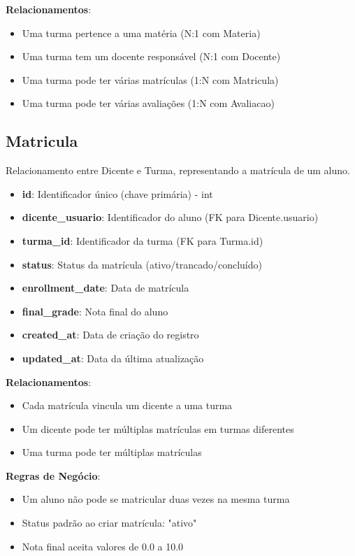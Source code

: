 \documentclass[a4paper,12pt]{article}
\begin{document}
\textbf{Relacionamentos}:
\begin{itemize}
    \item Uma turma pertence a uma matéria (N:1 com Materia)
    \item Uma turma tem um docente responsável (N:1 com Docente)
    \item Uma turma pode ter várias matrículas (1:N com Matricula)
    \item Uma turma pode ter várias avaliações (1:N com Avaliacao)
\end{itemize}

\subsection{Matricula}

Relacionamento entre Dicente e Turma, representando a matrícula de um aluno.

\begin{itemize}
    \item \textbf{id}: Identificador único (chave primária) - int
    \item \textbf{dicente\_usuario}: Identificador do aluno (FK para Dicente.usuario)
    \item \textbf{turma\_id}: Identificador da turma (FK para Turma.id)
    \item \textbf{status}: Status da matrícula (ativo/trancado/concluído)
    \item \textbf{enrollment\_date}: Data de matrícula
    \item \textbf{final\_grade}: Nota final do aluno
    \item \textbf{created\_at}: Data de criação do registro
    \item \textbf{updated\_at}: Data da última atualização
\end{itemize}

\textbf{Relacionamentos}:
\begin{itemize}
    \item Cada matrícula vincula um dicente a uma turma
    \item Um dicente pode ter múltiplas matrículas em turmas diferentes
    \item Uma turma pode ter múltiplas matrículas
\end{itemize}

\textbf{Regras de Negócio}:
\begin{itemize}
    \item Um aluno não pode se matricular duas vezes na mesma turma
    \item Status padrão ao criar matrícula: "ativo"
    \item Nota final aceita valores de 0.0 a 10.0
\end{itemize}
\end{document}
